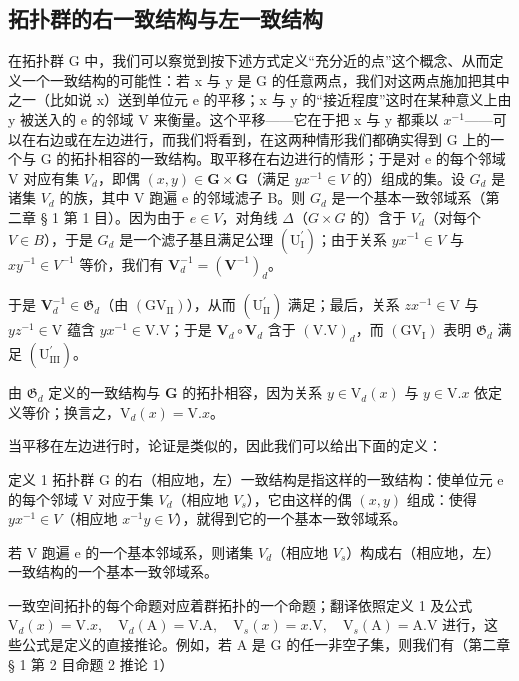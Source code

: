 \subsection{拓扑群的右一致结构与左一致结构}

在拓扑群 G 中，我们可以察觉到按下述方式定义“充分近的点”这个概念、从而定义一个一致结构的可能性：若 x 与 y 是 G 的任意两点，我们对这两点施加把其中之一（比如说 x）送到单位元 e 的平移；x 与 y 的“接近程度”这时在某种意义上由 y 被送入的 e 的邻域 V 来衡量。这个平移——它在于把 x 与 y 都乘以 \(x^{-1}\)——可以在右边或在左边进行，而我们将看到，在这两种情形我们都确实得到 G 上的一个与 G 的拓扑相容的一致结构。取平移在右边进行的情形；于是对 e 的每个邻域 V 对应有集 \(V_{d}\)，即偶 \((x, y) \in \mathbf{G} \times \mathbf{G}\)（满足 \(yx^{-1} \in V\) 的）组成的集。设 \(G_{d}\) 是诸集 \(V_{d}\) 的族，其中 V 跑遍 e 的邻域滤子 B。则 \(G_{d}\) 是一个基本一致邻域系（第二章 § 1 第 1 目）。因为由于 \(e \in V\)，对角线 \(\Delta\)（\(G \times G\) 的）含于 \(V_{d}\)（对每个 \(V \in B\)），于是 \(G_{d}\) 是一个滤子基且满足公理 \((\mathrm{U}_{\mathrm{I}}^{\prime})\)；由于关系 \(yx^{-1} \in V\) 与 \(xy^{-1} \in V^{-1}\) 等价，我们有 \(\mathbf{V}_{d}^{-1} = (\mathbf{V}^{-1})_{d}\)。

于是 \(\mathbf{V}_{d}^{-1}\in \mathfrak{G}_d\)（由 \((\mathrm{GV}_{\mathrm{II}})\)），从而 \((\mathrm{U}_{\mathrm{II}}^{\prime})\) 满足；最后，关系 \(zx^{-1}\in \mathrm{V}\) 与 \(yz^{-1}\in \mathrm{V}\) 蕴含 \(yx^{-1}\in \mathrm{V.V}\)；于是 \(\mathbf{V}_d\circ \mathbf{V}_d\) 含于 \((\mathrm{V.V})_d\)，而 \((\mathrm{GV}_{\mathrm{I}})\) 表明 \(\mathfrak{G}_d\) 满足 \((\mathrm{U}_{\mathrm{III}}^{\prime})\)。

由 \(\mathfrak{G}_d\) 定义的一致结构与 \(\mathbf{G}\) 的拓扑相容，因为关系 \(y \in \mathrm{V}_d(x)\) 与 \(y \in \mathrm{V}.x\) 依定义等价；换言之，\(\mathrm{V}_d(x) = \mathrm{V}.x\)。

当平移在左边进行时，论证是类似的，因此我们可以给出下面的定义：

定义 1 拓扑群 G 的右（相应地，左）一致结构是指这样的一致结构：使单位元 e 的每个邻域 V 对应于集 \(V_{d}\)（相应地 \(V_{s}\)），它由这样的偶 \((x, y)\) 组成：使得 \(y x^{-1} \in V\)（相应地 \(x^{-1} y \in V\)），就得到它的一个基本一致邻域系。

若 V 跑遍 e 的一个基本邻域系，则诸集 \(V_{d}\)（相应地 \(V_{s}\)）构成右（相应地，左）一致结构的一个基本一致邻域系。

一致空间拓扑的每个命题对应着群拓扑的一个命题；翻译依照定义 1 及公式 \(\mathrm{V}_{d}(x)=\mathrm{V}.x,\quad\mathrm{V}_{d}(\mathrm{A})=\mathrm{V}.\mathrm{A},\quad\mathrm{V}_{s}(x)=x.\mathrm{V},\quad\mathrm{V}_{s}(\mathrm{A})=\mathrm{A}.\mathrm{V}\) 进行，这些公式是定义的直接推论。例如，若 A 是 G 的任一非空子集，则我们有（第二章 § 1 第 2 目命题 2 推论 1）

